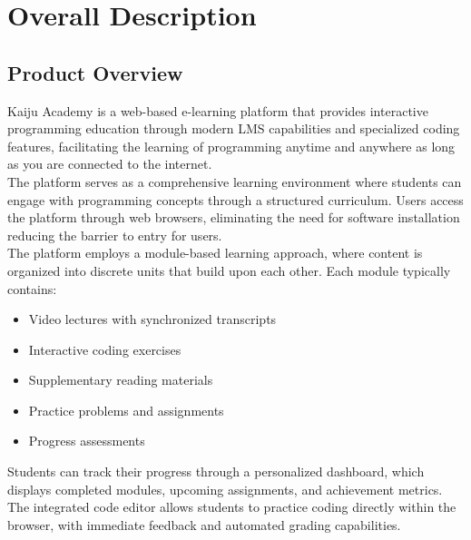 \documentclass[a4paper, 11pt]{scrreprt}
\begin{document}
\chapter{Overall Description}
\section{Product Overview}

Kaiju Academy is a web-based e-learning platform that provides interactive programming education through modern LMS capabilities and specialized coding features, facilitating the learning of programming anytime and anywhere as long as you are connected to the internet.\\

The platform serves as a comprehensive learning environment where students can engage with programming concepts through a structured curriculum. Users access the platform through web browsers, eliminating the need for software installation reducing the barrier to entry for users. \\

The platform employs a module-based learning approach, where content is organized into discrete units that build upon each other. Each module typically contains:

\begin{itemize}
    \item Video lectures with synchronized transcripts
    \item Interactive coding exercises
    \item Supplementary reading materials
    \item Practice problems and assignments
    \item Progress assessments
\end{itemize}

Students can track their progress through a personalized dashboard, which displays completed modules, upcoming assignments, and achievement metrics. The integrated code editor allows students to practice coding directly within the browser, with immediate feedback and automated grading capabilities. \\
\end{document}
